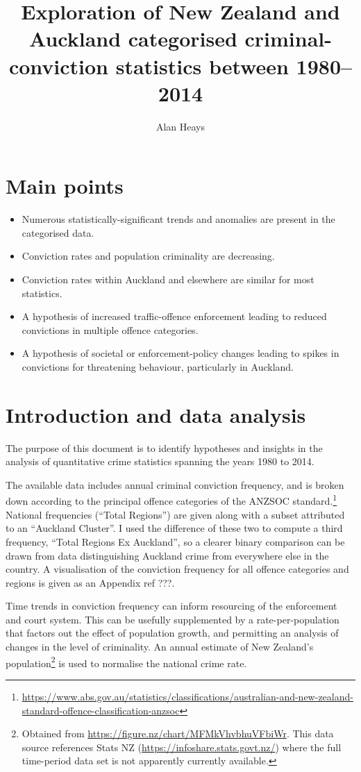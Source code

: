 \documentclass[onecolumn]{myarticle}
\title{Exploration of New Zealand and Auckland categorised criminal-conviction statistics between 1980–2014}
\author{Alan Heays}
\begin{document}
\maketitle

\section*{Main points}
\begin{itemize}
  \item Numerous statistically-significant trends and anomalies are present in the categorised data.
  \item Conviction rates and population criminality are decreasing.
  \item Conviction rates within Auckland and elsewhere are similar for most statistics.
  \item A hypothesis of increased traffic-offence enforcement leading to reduced convictions in multiple offence categories.
  \item A hypothesis of societal or enforcement-policy changes leading to spikes in convictions for threatening behaviour, particularly in Auckland.
\end{itemize}

\section*{Introduction and data analysis}

The purpose of this document is to identify hypotheses and insights in the analysis of quantitative crime statistics spanning the years 1980 to 2014.

The available data includes annual criminal conviction frequency, and is broken down according to the principal offence categories of the ANZSOC standard.\footnote{\url{https://www.abs.gov.au/statistics/classifications/australian-and-new-zealand-standard-offence-classification-anzsoc}}
National frequencies (``Total Regions'') are given along with a subset attributed to an ``Auckland Cluster''.  
I used the difference of these two to compute a third frequency, ``Total Regions Ex Auckland'', so a clearer binary comparison can be drawn from data distinguishing Auckland crime from everywhere else in the country.
A visualisation of the conviction frequency for all offence categories and regions is given as an Appendix ref ???.

Time trends in conviction frequency can inform resourcing of the enforcement and court system.
This can be usefully supplemented by a rate-per-population that factors out the effect of population growth, and permitting an analysis of changes in the level of criminality.
An annual estimate of New Zealand's population\footnote{Obtained from \url{https://figure.nz/chart/MFMkVhvbhuVFbiWr}. This data source references Stats NZ (\url{https://infoshare.stats.govt.nz/}) where the full time-period data set is not apparently currently available.}  is used to normalise the national crime rate.
\end{document}
